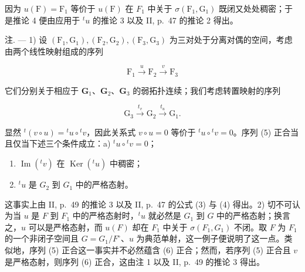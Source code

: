 因为 \(u(\mathrm{F}) = \mathrm{F}_{1}\) 等价于 \(u(\mathrm{F})\) 在 \(F_{1}\) 中关于 \(\sigma(\mathrm{F}_{1}, \mathrm{G}_{1})\) 既闭又处处稠密；于是推论 4 便由应用于 \(^{t}u\) 的推论 3 以及 II, p.~47 的推论 2 得出。

注. --- 1) 设 \((\mathrm{F}_1, \mathrm{G}_1), (\mathrm{F}_2, \mathrm{G}_2), (\mathrm{F}_3, \mathrm{G}_3)\) 为三对处于分离对偶的空间，考虑由两个线性映射组成的序列

\[
\mathrm{F} _ {1} \xrightarrow {u} \mathrm{F} _ {2} \xrightarrow {v} \mathrm{F} _ {3}\tag{5}
\]

它们分别关于相应于 \(\mathbf{G}_1\)、\(\mathbf{G}_2\)、\(\mathbf{G}_3\) 的弱拓扑连续；我们考虑转置映射的序列

\[
\mathrm{G} _ {3} \stackrel {{t _ {v}}} {{\to}} \mathrm{G} _ {2} \stackrel {{t _ {u}}} {{\to}} \mathrm{G} _ {1}.\tag{6}
\]

显然 \({}^t (v\circ u) = {}^t u\circ {}^tv\)，因此关系式 \(v\circ u = 0\) 等价于 \({}^t u\circ {}^tv = 0\)。序列 (5) 正合当且仅当下述三个条件成立：a) \({}^t u\circ {}^tv = 0\)；

\begin{enumerate}
\def\labelenumi{\alph{enumi})}
\setcounter{enumi}{1}
\item
  \(\operatorname{Im}(^{t}v)\) 在 \(\operatorname{Ker}(^{t}u)\) 中稠密；
\item
  \(^t u\) 是 \(G_2\) 到 \(G_1\) 中的严格态射。
\end{enumerate}

这事实上由 II, p.~49 的推论 3 以及 II, p.~47 的公式 (3) 与 (4) 得出。2) 切不可认为当 \(u\) 是 \(F\) 到 \(F_1\) 中的严格态射时，\(^t u\) 就必然是 \(G_1\) 到 \(G\) 中的严格态射；换言之，\(u\) 可以是严格态射，而 \(u(F)\) 却在 \(F_1\) 中关于 \(\sigma(F_1, G_1)\) 不闭。取 \(F\) 为 \(F_1\) 的一个非闭子空间且 \(G = G_1 / F^\circ\)、\(u\) 为典范单射，这一例子便说明了这一点。类似地，序列 (5) 正合这一事实并不必然蕴含 (6) 正合；然而，若序列 (5) 正合且 \(v\) 是严格态射，则序列 (6) 正合，这由注 1 以及 II, p.~49 的推论 3 得出。

